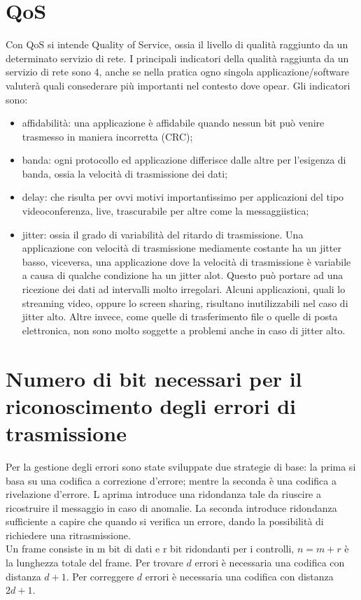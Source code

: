\documentclass{article}
\begin{document}
\section{QoS}

Con QoS si intende Quality of Service, ossia il livello di qualità raggiunto da
un determinato servizio di rete. I principali indicatori della qualità raggiunta
da un servizio di rete sono 4, anche se nella pratica ogno singola 
applicazione/software valuterà quali consederare più importanti nel contesto
dove opear. Gli indicatori sono:
\begin{itemize}
	\item affidabilità: una applicazione è affidabile quando nessun bit può
		venire trasmesso in maniera incorretta (CRC);

	\item banda: ogni protocollo ed applicazione differisce dalle altre per
		l'esigenza di banda, ossia la velocità di trasmissione dei dati;

	\item delay: che risulta per ovvi motivi importantissimo per applicazioni
		del tipo videoconferenza, live, trascurabile per altre come la
		messaggiistica;

	\item jitter: ossia il grado di variabilità del ritardo di trasmissione. Una
		applicazione con velocità di trasmissione mediamente costante ha un
		jitter basso, viceversa, una applicazione dove la velocità di
		trasmissione è variabile a causa di qualche condizione ha un jitter
		alot. Questo può portare ad una ricezione dei dati ad intervalli molto
		irregolari. Alcuni applicazioni, quali lo streaming video, oppure lo
		screen sharing, risultano inutilizzabili nel caso di jitter alto. Altre
		invece, come quelle di trasferimento file o quelle di posta elettronica,
		non sono molto soggette a problemi anche in caso di jitter alto.
\end{itemize}

\section{Numero di bit necessari per il riconoscimento degli errori di
trasmissione}

Per la gestione degli errori sono state sviluppate due strategie di base: la
prima si basa su una codifica a correzione d'errore; mentre la seconda è una
codifica a rivelazione d'errore. L aprima introduce una ridondanza tale da
riuscire a ricostruire il messaggio in caso di anomalie. La seconda introduce
ridondanza sufficiente a capire che quando si verifica un errore, dando la
possibilità di richiedere una ritrasmissione.\\
Un frame consiste in m bit di dati e r bit ridondanti per i controlli, $n=m+r$ è
la lunghezza totale del frame. Per trovare $d$ errori è necessaria una codifica
con distanza $d+1$. Per correggere $d$ errori è necessaria una codifica con
distanza $2d+1$.
\end{document}
